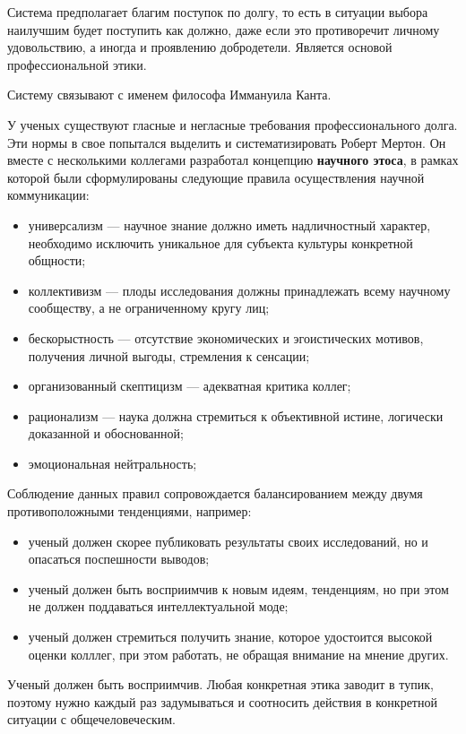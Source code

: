 Система предполагает благим поступок по долгу, то есть в ситуации выбора наилучшим будет
поступить как должно, даже если это противоречит личному удовольствию, а иногда
и проявлению добродетели. Является основой профессиональной этики.

Систему связывают с именем философа Иммануила Канта.


У ученых существуют гласные и негласные требования профессионального долга. Эти нормы в свое попытался выделить и систематизировать Роберт Мертон. Он вместе с несколькими коллегами разработал концепцию \textbf{научного этоса}, в рамках которой были сформулированы следующие правила осуществления научной коммуникации: 
\begin{itemize}
    \item универсализм --- научное знание должно иметь надличностный
    характер, необходимо исключить уникальное для субъекта культуры конкретной общности;
    \item коллективизм --- плоды исследования должны принадлежать всему научному сообществу,
    а не ограниченному кругу лиц;
    \item бескорыстность --- отсутствие экономических и эгоистических мотивов, получения личной выгоды, стремления к сенсации;
    \item организованный скептицизм --- адекватная критика коллег;
    \item рационализм --- наука должна стремиться к объективной истине, логически доказанной и
    обоснованной;
    \item эмоциональная нейтральность;
\end{itemize}

Соблюдение данных правил сопровождается балансированием между двумя противоположными тенденциями, например:
\begin{itemize}
    \item ученый должен скорее публиковать результаты своих исследований, но и опасаться
    поспешности выводов;
    \item ученый должен быть восприимчив к новым идеям, тенденциям, но при этом не должен поддаваться интеллектуальной моде;
    \item ученый должен стремиться получить знание, которое удостоится высокой оценки колллег, при этом работать, не обращая внимание на мнение других.
\end{itemize} Ученый должен быть восприимчив.
Любая конкретная этика заводит в тупик, поэтому нужно каждый раз задумываться и соотносить действия в конкретной ситуации с общечеловеческим. 


